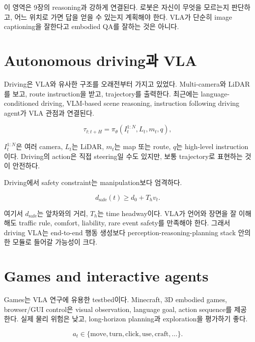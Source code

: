 이 영역은 9장의 reasoning과 강하게 연결된다. 로봇은 자신이 무엇을 모르는지 판단하고, 어느 위치로 가면 답을 얻을 수 있는지 계획해야 한다. VLA가 단순히 image captioning을 잘한다고 embodied QA를 잘하는 것은 아니다.

\section{Autonomous driving과 VLA}

Driving은 VLA와 유사한 구조를 오래전부터 가지고 있었다. Multi-camera와 LiDAR를 보고, route instruction을 받고, trajectory를 출력한다. 최근에는 language-conditioned driving, VLM-based scene reasoning, instruction following driving agent가 VLA 관점과 연결된다.

\begin{equation}
  \tau_{t:t+H}
  =
  \pi_\theta
  (I_t^{1:N}, L_t, m_t, q),
\end{equation}

$I_t^{1:N}$은 여러 camera, $L_t$는 LiDAR, $m_t$는 map 또는 route, $q$는 high-level instruction이다. Driving의 action은 직접 steering일 수도 있지만, 보통 trajectory로 표현하는 것이 안전하다.

Driving에서 safety constraint는 manipulation보다 엄격하다.

\begin{equation}
  d_{\mathrm{safe}}(t)
  \ge
  d_0
  +
  T_h v_t.
\end{equation}

여기서 $d_{\mathrm{safe}}$는 앞차와의 거리, $T_h$는 time headway이다. VLA가 언어와 장면을 잘 이해해도 traffic rule, comfort, liability, rare event safety를 만족해야 한다. 그래서 driving VLA는 end-to-end 행동 생성보다 perception-reasoning-planning stack 안의 한 모듈로 들어갈 가능성이 크다.

\section{Games and interactive agents}

Games는 VLA 연구에 유용한 testbed이다. Minecraft, 3D embodied games, browser/GUI control은 visual observation, language goal, action sequence를 제공한다. 실제 물리 위험은 낮고, long-horizon planning과 exploration을 평가하기 좋다.

\begin{equation}
  a_t \in
  \{\mathrm{move}, \mathrm{turn}, \mathrm{click}, \mathrm{use}, \mathrm{craft}, \ldots\}.
\end{equation}

